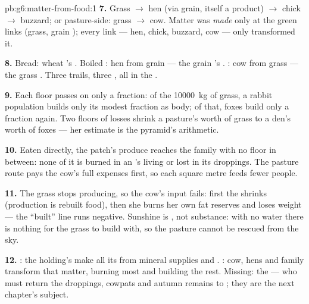 \begin{solution}{pb:g6:matter-from-food:1}
\textbf{7.} Grass $\rightarrow$ hen (via grain, itself a
 product) $\rightarrow$ chick $\rightarrow$ buzzard;
or pasture-side: grass $\rightarrow$ cow. Matter was
\emph{made} only at the green links (grass, grain );
every  link --- hen, chick, buzzard, cow --- only
transformed it.

\textbf{8.} Bread: wheat 's . Boiled : hen
from grain --- the grain 's . : cow from
grass --- the grass . Three trails, three ,
all in the .

\textbf{9.} Each floor passes on only a fraction: of the
\qty{10000}{kg} of grass, a rabbit population builds only
its modest fraction as body; of that, foxes build only a
fraction again. Two floors of losses shrink a pasture's
worth of grass to a den's worth of foxes --- her estimate
is the pyramid's arithmetic.

\textbf{10.} Eaten directly, the patch's produce reaches
the family with no  floor in between: none of it
is burned in an 's living or lost in its droppings.
The pasture route pays the cow's full expenses first, so
each square metre feeds fewer people.

\textbf{11.} The grass stops producing, so the cow's input
fails: first the  shrinks (production is rebuilt food),
then she burns her own fat reserves and loses weight ---
the ``built'' line runs negative. Sunshine is , not
substance: with no water there is nothing for the grass to
build with, so the pasture cannot be rescued from the sky.

\textbf{12.} : the holding's  make all its
 from mineral supplies and . :
cow, hens and family transform that matter, burning most
and building the rest. Missing: the  --- who
must return the droppings, cowpats and autumn remains to
; they are the next chapter's subject.
\end{solution}
